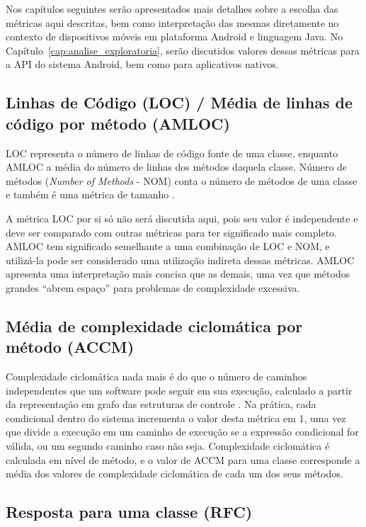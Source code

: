 Nos capítulos seguintes serão apresentados mais detalhes sobre a escolha das métricas aqui descritas, bem como interpretação das mesmas diretamente no contexto de dispositivos móveis em plataforma Android e linguagem Java. No Capítulo~\ref{cap:analise_exploratoria}, serão discutidos valores dessas métricas para a API do sistema Android, bem como para aplicativos nativos.

\subsection{Linhas de Código (LOC) / Média de linhas de código por método (AMLOC)}

LOC representa o número de linhas de código fonte de uma classe, enquanto AMLOC a média do número de linhas dos métodos daquela classe. Número de métodos (\textit{Number of Methods} - NOM) conta o número de métodos de uma classe e também é uma métrica de tamanho \cite{sharma2012comparative}.

A métrica LOC por si só não será discutida aqui, pois seu valor é independente e deve ser comparado com outras métricas para ter significado mais completo. AMLOC tem significado semelhante a uma combinação de LOC e NOM, e utilizá-la pode ser considerado uma utilização indireta dessas métricas. AMLOC apresenta uma interpretação mais concisa que as demais, uma vez que métodos grandes ``abrem espaço'' para problemas de complexidade excessiva. 

\subsection{Média de complexidade ciclomática por método (ACCM)}

Complexidade ciclomática nada mais é do que o número de caminhos independentes que um software pode seguir em sua execução, calculado a partir da representação em grafo das estruturas de controle \cite{shepperd1988critique}. Na prática, cada condicional dentro do sistema incrementa o valor desta métrica em 1, uma vez que divide a execução em um caminho de execução se a expressão condicional for válida, ou um segundo caminho caso não seja. Complexidade ciclomática é calculada em nível de método, e o valor de ACCM para uma classe corresponde a média dos valores de complexidade ciclomática de cada um dos seus métodos.

\subsection{Resposta para uma classe (RFC)}

